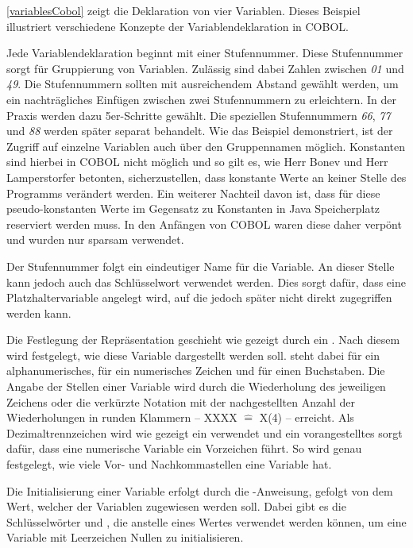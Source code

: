\autoref{variablesCobol} zeigt die Deklaration von vier Variablen. Dieses Beispiel illustriert verschiedene Konzepte der Variablendeklaration in COBOL.

Jede Variablendeklaration beginnt mit einer Stufennummer. Diese Stufennummer sorgt für Gruppierung von Variablen. Zulässig sind dabei Zahlen zwischen \textit{01} und \textit{49}. Die Stufennummern sollten mit ausreichendem Abstand gewählt werden, um ein nachträgliches Einfügen zwischen zwei Stufennummern zu erleichtern. In der Praxis werden dazu \idR 5er-Schritte gewählt. Die speziellen Stufennummern \textit{66}, \textit{77} und \textit{88} werden später separat behandelt. Wie das Beispiel demonstriert, ist der Zugriff auf einzelne Variablen auch über den Gruppennamen möglich. Konstanten sind hierbei in COBOL nicht möglich und so gilt es, wie Herr Bonev und Herr Lamperstorfer betonten, sicherzustellen, dass konstante Werte an keiner Stelle des Programms verändert werden. Ein weiterer Nachteil davon ist, dass für diese pseudo-konstanten Werte im Gegensatz zu Konstanten in Java Speicherplatz reserviert werden muss. In den Anfängen von COBOL waren diese  daher verpönt und wurden nur sparsam verwendet.

Der Stufennummer folgt ein eindeutiger Name für die Variable. An dieser Stelle kann jedoch auch das Schlüsselwort  verwendet werden. Dies sorgt dafür, dass eine Platzhaltervariable angelegt wird, auf die jedoch später nicht direkt zugegriffen werden kann.

Die Festlegung der Repräsentation geschieht wie gezeigt durch ein . Nach diesem  wird festgelegt, wie diese Variable dargestellt werden soll.  steht dabei für ein alphanumerisches,  für ein numerisches Zeichen und  für einen Buchstaben. Die Angabe der Stellen einer Variable wird durch die Wiederholung des jeweiligen Zeichens oder die verkürzte Notation mit der nachgestellten Anzahl der Wiederholungen in runden Klammern -- \zB XXXX $\widehat{=}$ X(4) -- erreicht. Als Dezimaltrennzeichen wird wie gezeigt ein  verwendet und ein vorangestelltes  sorgt dafür, dass eine numerische Variable ein Vorzeichen führt. So wird genau festgelegt, wie viele Vor- und Nachkommastellen eine Variable hat.

Die Initialisierung einer Variable erfolgt durch die -Anweisung, gefolgt von dem Wert, welcher der Variablen zugewiesen werden soll. Dabei gibt es die Schlüsselwörter  \bzw {} und  \bzw {}, die anstelle eines Wertes verwendet werden können, um eine Variable mit Leerzeichen \bzw Nullen zu initialisieren.

